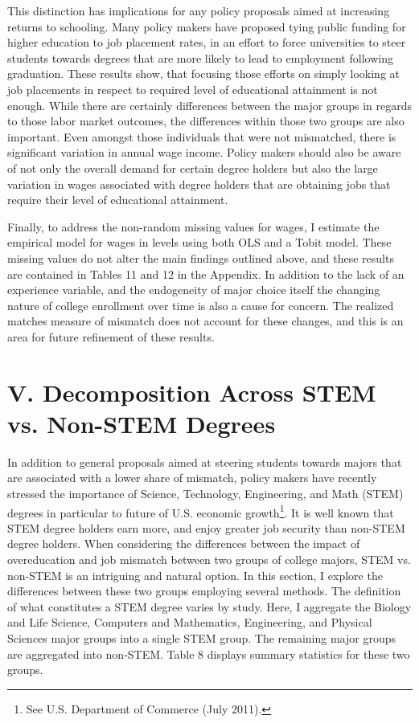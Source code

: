 \documentclass[11pt]{article}
\theoremstyle{definition}
\begin{document}
This distinction has implications for any policy proposals aimed at increasing returns to schooling.  Many policy makers have proposed tying public funding for higher education to job placement rates, in an effort to force universities to steer students towards degrees that are more likely to lead to employment following graduation.  These results show, that focusing those efforts on simply looking at job placements in respect to required level of educational attainment is not enough.  While there are certainly differences between the major groups in regards to those labor market outcomes, the differences within those two groups are also important.  Even amongst those individuals that were not mismatched, there is significant variation in annual wage income.  Policy makers should also be aware of not only the overall demand for certain degree holders but also the large variation in wages associated with degree holders that are obtaining jobs that require their level of educational attainment.  

Finally, to address the non-random missing values for wages, I estimate the empirical model for wages in levels using both OLS and a Tobit model.  These missing values do not alter the main findings outlined above, and these results are contained in Tables 11 and 12 in the Appendix.  In addition to the lack of an experience variable, and the endogeneity of major choice itself the changing nature of college enrollment over time is also a cause for concern.  The realized matches measure of mismatch does not account for these changes, and this is an area for future refinement of these results.

\section*{V. Decomposition Across STEM vs. Non-STEM Degrees}

\indent
\par
In addition to general proposals aimed at steering students towards majors that are associated with a lower share of mismatch, policy makers have recently stressed the importance of Science, Technology, Engineering, and Math (STEM) degrees in particular to future of U.S. economic growth\footnote{See U.S. Department of Commerce (July 2011).}.  It is well known that STEM degree holders earn more, and enjoy greater job security than non-STEM degree holders.  When considering the differences between the impact of overeducation and job mismatch between two groups of college majors, STEM vs. non-STEM is an intriguing and natural option.  In this section, I explore the differences between these two groups employing several methods.  The definition of what constitutes a STEM degree varies by study.  Here, I aggregate the Biology and Life Science, Computers and Mathematics, Engineering, and Physical Sciences major groups into a single STEM group.  The remaining major groups are aggregated into non-STEM.  Table 8 displays summary statistics for these two groups.  
\end{document}
